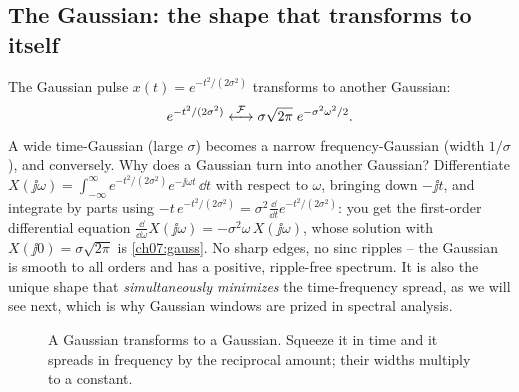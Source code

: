 \subsection{The Gaussian: the shape that transforms to itself}
The Gaussian pulse $x(t) = e^{-t^2/(2\sigma^2)}$ transforms to another Gaussian:
\begin{equation}
\label{ch07:gauss}
e^{-t^2/(2\sigma^2)} \overset{\mathcal{F}}{\longleftrightarrow}
\sigma\sqrt{2\pi}\; e^{-\sigma^2\omega^2/2}.
\end{equation}
A wide time-Gaussian (large $\sigma$) becomes a narrow frequency-Gaussian (width
$1/\sigma$), and conversely. Why does a Gaussian turn into another Gaussian? Differentiate
$X(\jj\omega) = \int_{-\infty}^{\infty} e^{-t^2/(2\sigma^2)} e^{-\jj\omega t}\,\dd t$ with
respect to $\omega$, bringing down $-\jj t$, and integrate by parts using
$-t\,e^{-t^2/(2\sigma^2)} = \sigma^2 \frac{\dd}{\dd t} e^{-t^2/(2\sigma^2)}$: you get the
first-order differential equation $\frac{\dd}{\dd\omega}X(\jj\omega) = -\sigma^2\omega\,X(\jj\omega)$,
whose solution with $X(\jj 0) = \sigma\sqrt{2\pi}$ is \eqref{ch07:gauss}. No sharp edges, no
sinc ripples -- the Gaussian is smooth to all orders and has a positive, ripple-free spectrum. It is
also the unique shape that \emph{simultaneously minimizes} the time-frequency spread, as
we will see next, which is why Gaussian windows are prized in spectral analysis.

\begin{figure}[H]
\centering
{}
\caption{A Gaussian transforms to a Gaussian. Squeeze it in time and it spreads in
frequency by the reciprocal amount; their widths multiply to a constant.}
\label{ch07:fig-gauss}
\end{figure}


